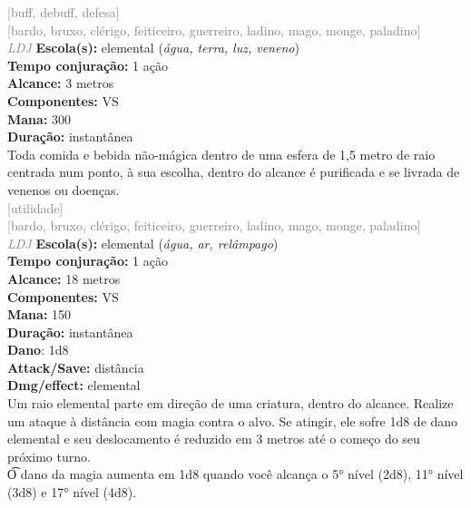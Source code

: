 \documentclass{RPG_Adventure}[2021/10/20]
\begin{document}
{\scriptsize \textcolor{gray}{[buff, debuff, defesa]\\}}
{\scriptsize \textcolor{gray}{[bardo, bruxo, clérigo, feiticeiro, guerreiro, ladino, mago, monge, paladino]\\}}
{\tiny \textcolor{gray}{\textit{LDJ}}}
{\small \t \textbf{Escola(s):} elemental (\textit{água, terra, luz, veneno})\\\t \textbf{Tempo conjuração:} 1 ação\\\t \textbf{Alcance:} 3 metros\\\t \textbf{Componentes:} VS\\\t \textbf{Mana:} 300\\\t \textbf{Duração:} instantânea\\}
{\normalsize Toda comida e bebida não-mágica dentro de uma esfera de 1,5 metro de raio centrada num ponto, à sua escolha, dentro do alcance é purificada e se livrada de venenos ou doenças.\\}
{\scriptsize \textcolor{gray}{[utilidade]\\}}
{\scriptsize \textcolor{gray}{[bardo, bruxo, clérigo, feiticeiro, guerreiro, ladino, mago, monge, paladino]\\}}
{\tiny \textcolor{gray}{\textit{LDJ}}}
{\small \t \textbf{Escola(s):} elemental (\textit{água, ar, relâmpago})\\\t \textbf{Tempo conjuração:} 1 ação\\\t \textbf{Alcance:} 18 metros\\\t \textbf{Componentes:} VS\\\t \textbf{Mana:} 150\\\t \textbf{Duração:} instantânea\\\t \textbf{Dano}: 1d8\\\t \textbf{Attack/Save:} distância\\\t \textbf{Dmg/effect:} elemental\\}
{\normalsize Um raio elemental parte em direção de uma criatura, dentro do alcance. Realize um ataque à distância com magia contra o alvo. Se atingir, ele sofre 1d8 de dano elemental e seu deslocamento é reduzido em 3 metros até o começo do seu próximo turno.\\\t O dano da magia aumenta em 1d8 quando você alcança o 5° nível (2d8), 11° nível (3d8) e 17° nível (4d8).\\}
\end{document}
